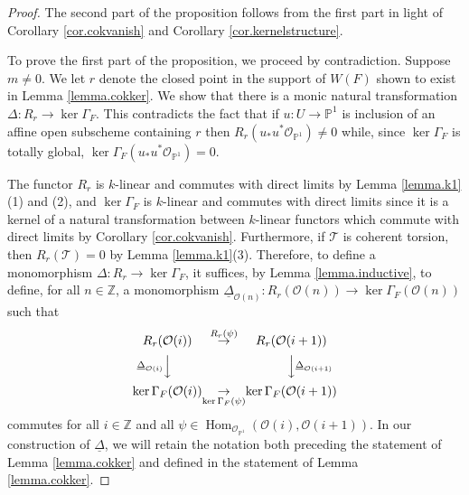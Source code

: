 \documentclass[10pt]{amsart}
\theoremstyle{definition}
\theoremstyle{remark}
\numberwithin{equation}{section}
\begin{document}
\begin{proof}
The second part of the proposition follows from the first part in light of Corollary \ref{cor.cokvanish} and Corollary \ref{cor.kernelstructure}.

To prove the first part of the proposition, we proceed by contradiction.  Suppose $m \neq 0$.  We let $r$ denote the closed point in the support of $W(F)$ shown to exist in Lemma \ref{lemma.cokker}.  We show that there is a monic natural transformation $\Delta:R_{r} \rightarrow {\operatorname{ker }\Gamma_{F}}$.  This contradicts the fact that if $u:U \rightarrow \mathbb{P}^{1}$ is inclusion of an affine open subscheme containing $r$ then $R_{r}(u_{*}u^{*}\mathcal{O}_{\mathbb{P}^{1}}) \neq 0$ while, since ${\operatorname{ker }\Gamma_{F}}$ is totally global, ${\operatorname{ker }\Gamma_{F}} (u_{*}u^{*}\mathcal{O}_{\mathbb{P}^{1}})=0$.

The functor $R_{r}$ is $k$-linear and commutes with direct limits by Lemma \ref{lemma.k1}(1) and (2), and ${\operatorname{ker }\Gamma_{F}}$ is $k$-linear and commutes with direct limits since it is a kernel of a natural transformation between $k$-linear functors which commute with direct limits by Corollary \ref{cor.cokvanish}.  Furthermore, if $\mathcal{T}$ is coherent torsion, then $R_{r}(\mathcal{T})=0$ by Lemma \ref{lemma.k1}(3).  Therefore, to define a monomorphism $\Delta:R_{r} \rightarrow {\operatorname{ker }\Gamma_{F}}$, it suffices, by Lemma \ref{lemma.inductive}, to define, for all $n \in \mathbb{Z}$, a monomorphism $\underline{\Delta}_{\mathcal{O}(n)}:R_{r}(\mathcal{O}(n)) \rightarrow {\operatorname{ker }\Gamma_{F}}(\mathcal{O}(n))$ such that
\begin{equation} \label{eqn.mainsquare}
\begin{CD}
R_{r}(\mathcal{O}(i)) & \overset{R_{r}(\psi)}{\rightarrow} & R_{r}(\mathcal{O}(i+1)) \\
@V{\underline{\Delta}_{\mathcal{O}(i)}}VV @VV{\underline{\Delta}_{\mathcal{O}(i+1)}}V \\
{\operatorname{ker }\Gamma_{F}}(\mathcal{O}(i)) & \underset{{\operatorname{ker }\Gamma_{F}}(\psi)}{\rightarrow} & {\operatorname{ker }\Gamma_{F}}(\mathcal{O}(i+1))
\end{CD}
\end{equation}
commutes for all $i \in \mathbb{Z}$ and all $\psi \in \operatorname{Hom}_{\mathcal{O}_{\mathbb{P}^{1}}}(\mathcal{O}(i),\mathcal{O}(i+1))$. In our construction of $\underline{\Delta}$, we will retain the notation both preceding the statement of Lemma \ref{lemma.cokker} and defined in the statement of Lemma \ref{lemma.cokker}.


\end{proof}
\end{document}
